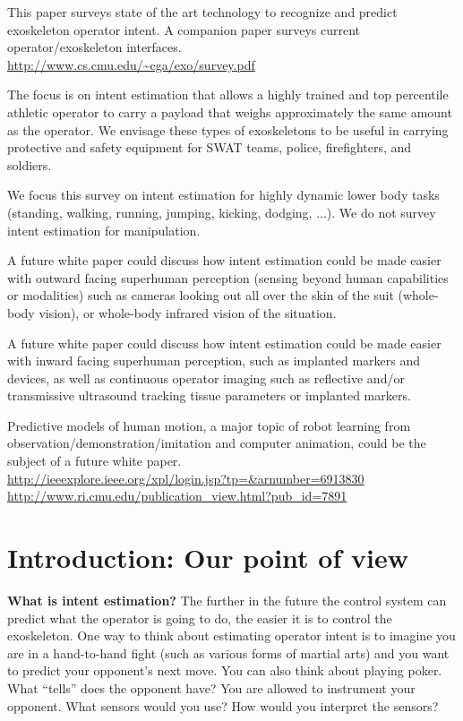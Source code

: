 \documentclass[letterpaper,12pt,fullpage]{article}
\begin{document}
This paper surveys state of the art technology to recognize
and predict exoskeleton
operator intent.
A companion paper surveys current operator/exoskeleton interfaces.\\
\url{http://www.cs.cmu.edu/~cga/exo/survey.pdf}

The focus is on intent estimation that allows a
highly trained and top percentile athletic 
operator to carry a payload that weighs approximately the same amount
as the operator. We envisage these types of exoskeletons to be useful
in carrying protective and safety equipment for SWAT teams, police,
firefighters, and soldiers. 

We focus this survey on intent estimation for highly dynamic 
lower body tasks (standing, walking,
running, jumping, kicking, dodging, ...).
We do not survey intent estimation for manipulation. 

A future white paper could discuss how intent estimation could be 
made easier with outward facing
superhuman perception (sensing beyond human capabilities
or modalities) such as cameras looking out all over the skin
of the suit (whole-body vision), or whole-body 
infrared vision of the situation.

A future white paper could discuss how intent estimation could be 
made easier with inward facing superhuman perception,
such as implanted markers and devices, as well as continuous
operator imaging such as reflective and/or transmissive ultrasound
tracking tissue parameters or implanted markers.

Predictive models of human motion, a major topic of robot learning from\\
observation/demonstration/imitation and computer animation,
could be the subject of a future white
paper.\\
\url{http://ieeexplore.ieee.org/xpl/login.jsp?tp=&arnumber=6913830}\\
\url{http://www.ri.cmu.edu/publication_view.html?pub_id=7891}

\section{Introduction: Our point of view}

{\bf What is intent estimation?}
The further in the future the control system can predict what the operator
is going to do, the easier it is to control the exoskeleton. One way
to think about estimating operator intent is to imagine you are in
a hand-to-hand fight (such as various forms of martial arts)
and you want to predict your opponent's next move.
You can also think about playing poker. What ``tells'' does the opponent
have?
You are allowed to instrument your opponent. What sensors would you use?
How would you interpret the sensors?
\end{document}
